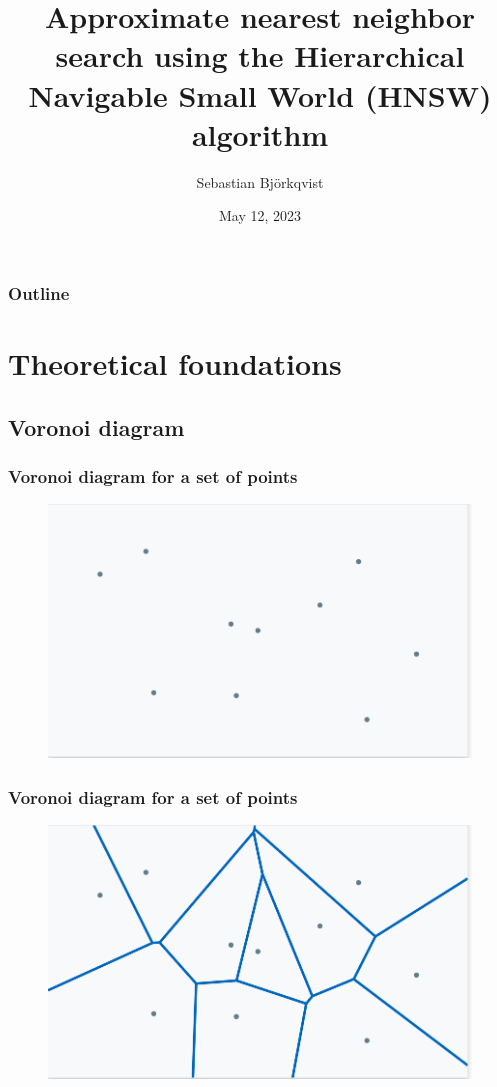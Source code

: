 \documentclass{beamer}
\title{Approximate nearest neighbor search using the Hierarchical Navigable Small World (HNSW) algorithm}
\author{Sebastian Bj{\"o}rkqvist}
\institute{Lead AI Developer, IPRally}
\date[12.05.2023]{May 12, 2023}
\begin{document}

\frame{\titlepage}


\begin{frame}
\frametitle{Outline}
  \tableofcontents
\end{frame}
\section{Theoretical foundations}
\subsection{Voronoi diagram}
  \begin{frame}
    \frametitle{Voronoi diagram for a set of points}  
  \begin{figure}[original_points]
    \vspace*{-0.1cm}
  	\includegraphics[scale=0.25]{original_points} 	
  \end{figure} 
  \end{frame}
  \begin{frame}
    \frametitle{Voronoi diagram for a set of points}  
  \begin{figure}[voronoi_diagram]
    \vspace*{-0.1cm}
  	\includegraphics[scale=0.3]{voronoi_diagram} 	
  \end{figure} 
  \end{frame} 
\end{document}
